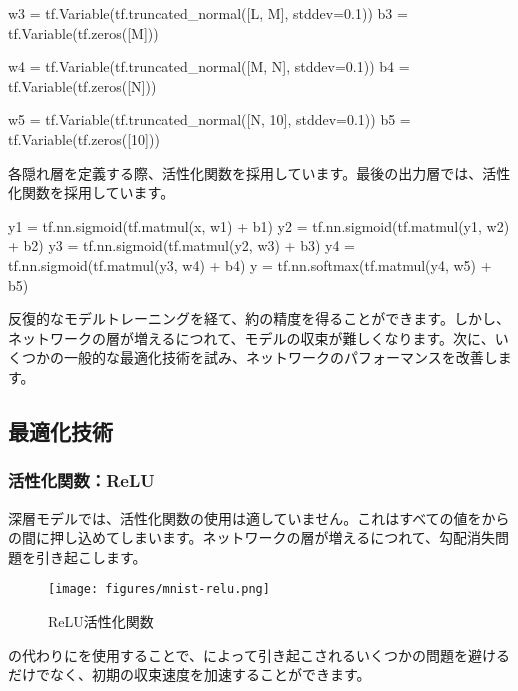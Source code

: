 \begin{content}
\begin{content}
\begin{leftbar}
\begin{python}
w3 = tf.Variable(tf.truncated_normal([L, M], stddev=0.1)) 
b3 = tf.Variable(tf.zeros([M]))

w4 = tf.Variable(tf.truncated_normal([M, N], stddev=0.1)) 
b4 = tf.Variable(tf.zeros([N]))

w5 = tf.Variable(tf.truncated_normal([N, 10], stddev=0.1)) 
b5 = tf.Variable(tf.zeros([10]))
\end{python}
\end{leftbar}

各隠れ層を定義する際、活性化関数を採用しています。最後の出力層では、活性化関数を採用しています。

\begin{leftbar}
\begin{python}
y1 = tf.nn.sigmoid(tf.matmul(x,  w1) + b1)
y2 = tf.nn.sigmoid(tf.matmul(y1, w2) + b2)
y3 = tf.nn.sigmoid(tf.matmul(y2, w3) + b3)
y4 = tf.nn.sigmoid(tf.matmul(y3, w4) + b4)
y  = tf.nn.softmax(tf.matmul(y4, w5) + b5)
\end{python}
\end{leftbar}

反復的なモデルトレーニングを経て、約の精度を得ることができます。しかし、ネットワークの層が増えるにつれて、モデルの収束が難しくなります。次に、いくつかの一般的な最適化技術を試み、ネットワークのパフォーマンスを改善します。

\subsection{最適化技術}

\subsubsection{活性化関数：ReLU}

深層モデルでは、活性化関数の使用は適していません。これはすべての値をからの間に押し込めてしまいます。ネットワークの層が増えるにつれて、勾配消失問題を引き起こします。

\begin{figure}[H]
\centering
\texttt{[image: figures/mnist-relu.png]}
\caption{ReLU活性化関数}
 \label{fig:mnist-relu}
\end{figure}

の代わりにを使用することで、によって引き起こされるいくつかの問題を避けるだけでなく、初期の収束速度を加速することができます。


\end{content}
\end{content}
